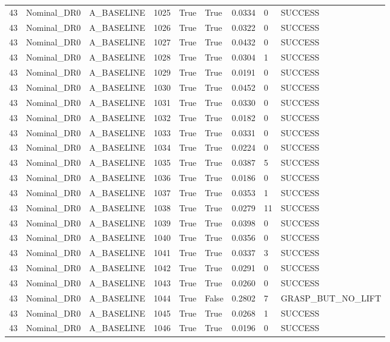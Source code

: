 \documentclass[11pt,a4paper,oneside]{book}
\begin{document}
\begin{longtable}{l l l l l l l l l}
43 & Nominal\_DR0 & A\_BASELINE & 1025 & True & True & 0.0334 & 0 & SUCCESS \\
43 & Nominal\_DR0 & A\_BASELINE & 1026 & True & True & 0.0322 & 0 & SUCCESS \\
43 & Nominal\_DR0 & A\_BASELINE & 1027 & True & True & 0.0432 & 0 & SUCCESS \\
43 & Nominal\_DR0 & A\_BASELINE & 1028 & True & True & 0.0304 & 1 & SUCCESS \\
43 & Nominal\_DR0 & A\_BASELINE & 1029 & True & True & 0.0191 & 0 & SUCCESS \\
43 & Nominal\_DR0 & A\_BASELINE & 1030 & True & True & 0.0452 & 0 & SUCCESS \\
43 & Nominal\_DR0 & A\_BASELINE & 1031 & True & True & 0.0330 & 0 & SUCCESS \\
43 & Nominal\_DR0 & A\_BASELINE & 1032 & True & True & 0.0182 & 0 & SUCCESS \\
43 & Nominal\_DR0 & A\_BASELINE & 1033 & True & True & 0.0331 & 0 & SUCCESS \\
43 & Nominal\_DR0 & A\_BASELINE & 1034 & True & True & 0.0224 & 0 & SUCCESS \\
43 & Nominal\_DR0 & A\_BASELINE & 1035 & True & True & 0.0387 & 5 & SUCCESS \\
43 & Nominal\_DR0 & A\_BASELINE & 1036 & True & True & 0.0186 & 0 & SUCCESS \\
43 & Nominal\_DR0 & A\_BASELINE & 1037 & True & True & 0.0353 & 1 & SUCCESS \\
43 & Nominal\_DR0 & A\_BASELINE & 1038 & True & True & 0.0279 & 11 & SUCCESS \\
43 & Nominal\_DR0 & A\_BASELINE & 1039 & True & True & 0.0398 & 0 & SUCCESS \\
43 & Nominal\_DR0 & A\_BASELINE & 1040 & True & True & 0.0356 & 0 & SUCCESS \\
43 & Nominal\_DR0 & A\_BASELINE & 1041 & True & True & 0.0337 & 3 & SUCCESS \\
43 & Nominal\_DR0 & A\_BASELINE & 1042 & True & True & 0.0291 & 0 & SUCCESS \\
43 & Nominal\_DR0 & A\_BASELINE & 1043 & True & True & 0.0260 & 0 & SUCCESS \\
43 & Nominal\_DR0 & A\_BASELINE & 1044 & True & False & 0.2802 & 7 & GRASP\_BUT\_NO\_LIFT \\
43 & Nominal\_DR0 & A\_BASELINE & 1045 & True & True & 0.0268 & 1 & SUCCESS \\
43 & Nominal\_DR0 & A\_BASELINE & 1046 & True & True & 0.0196 & 0 & SUCCESS \\

\end{longtable}
\end{document}
